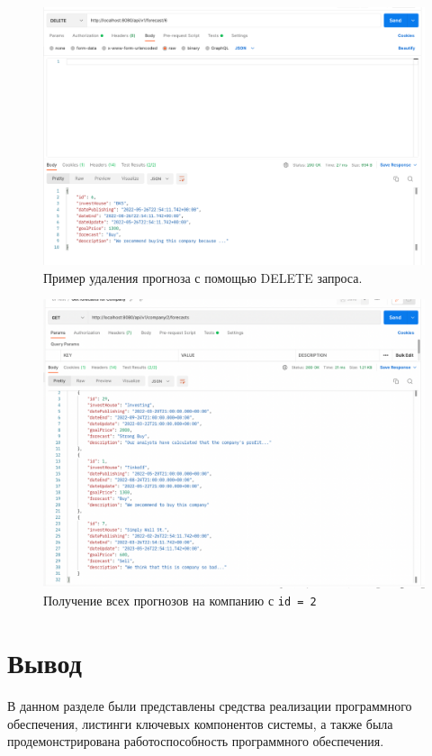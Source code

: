 \begin{figure}[h!]
	\begin{center}
		\includegraphics[scale=0.44]{inc/img/delete.png}
	\end{center}
	\captionsetup{justification=centering}
	\caption{Пример удаления прогноза с помощью DELETE запроса.}
	\label{img:delete-example}
\end{figure}

\newpage

\begin{figure}[h!]
	\begin{center}
		\includegraphics[scale=0.44]{inc/img/get.png}
	\end{center}
	\captionsetup{justification=centering}
	\caption{Получение всех прогнозов на компанию с \texttt{id = 2}}
	\label{img:get-example}
\end{figure}

\section*{Вывод}

В данном разделе были представлены средства реализации программного обеспечения, листинги ключевых компонентов системы, а также была продемонстрирована работоспособность программного обеспечения.